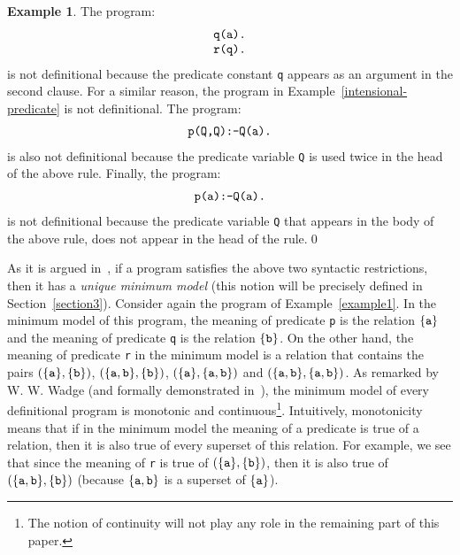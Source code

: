 \documentclass[submission,copyright]{eptcs}
\theoremstyle{definition}
\newtheorem{example}{Example}
\begin{document}
\begin{example}\label{example2}
The program:
\[
\begin{array}{l}
\mbox{\tt q(a).}\\
\mbox{\tt r(q).}
\end{array}
\]
is not definitional because the predicate constant {\tt q} appears as an
argument in the second clause. For a similar reason, the program in
Example~\ref{intensional-predicate} is not definitional. The program:
\[
\begin{array}{l}
\mbox{\tt p(Q,Q):-Q(a).}
\end{array}
\]
is also not definitional because the predicate variable {\tt Q} is used twice in the
head of the above rule. Finally, the program:
\[
\begin{array}{l}
\mbox{\tt p(a):-Q(a).}
\end{array}
\]
is not definitional because the predicate variable {\tt Q} that appears in the
body of the above rule, does not appear in the head of the rule.\qed
\end{example}
As it is argued in~\cite{Wa91a}, if a program satisfies the above two syntactic restrictions,
then it has a {\em unique minimum model} (this notion will be precisely defined in
Section~\ref{section3}). Consider again the program of Example~\ref{example1}. In the minimum
model of this program, the meaning of predicate {\tt p} is the relation $\{{\tt a}\}$ and
the meaning of predicate {\tt q} is the relation $\{{\tt b}\}$. On the other hand, the meaning
of predicate {\tt r} in the minimum model is a relation that contains the pairs $(\{{\tt a}\},\{{\tt b}\})$,
$(\{{\tt a,b}\},\{{\tt b}\})$, $(\{{\tt a}\},\{{\tt a,b}\})$ and $(\{{\tt a,b}\},\{{\tt a,b}\})$.
As remarked by W. W. Wadge (and formally demonstrated in~\cite{KRW05,CharalambidisHRW13}), the minimum
model of every definitional program is monotonic and continuous\footnote{The notion of continuity
will not play any role in the remaining part of this paper.}. Intuitively, monotonicity means
that if in the minimum model the meaning of a predicate is true of a relation, then it is also
true of every superset of this relation. For example, we see that since the meaning of {\tt r}
is true of  $(\{{\tt a}\},\{{\tt b}\})$, then it is also true of $(\{{\tt a,b}\},\{{\tt b}\})$
(because $\{{\tt a,b}\}$ is a superset of $\{{\tt a}\}$).
\end{document}
